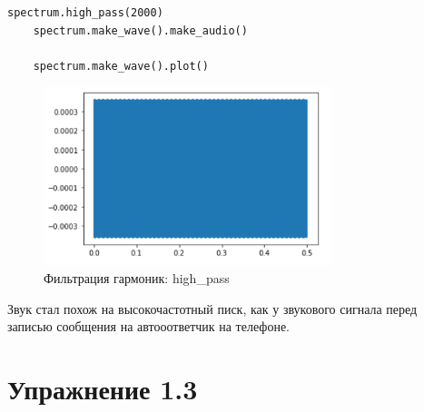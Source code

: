 \documentclass[a4paper,12pt]{article}
\begin{document}
\begin{lstlisting}[caption=Фильтрация гармоник: high\_pass]
	spectrum.high_pass(2000)
	spectrum.make_wave().make_audio()
	
	spectrum.make_wave().plot()
\end{lstlisting}
\begin{figure}[H]
	\centering
	\includegraphics[width=0.75\textwidth]{2_7.png}
	\caption{Фильтрация гармоник: high\_pass}
	\label{fig:2.6}
\end{figure}

Звук стал похож на высокочастотный писк, как у звукового сигнала перед записью сообщения на автооответчик на телефоне.

\section{Упражнение 1.3}
\end{document}
